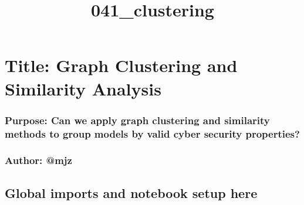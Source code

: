 \documentclass[11pt]{article}
\title{041\_clustering}
\begin{document}
    
    \maketitle
    
    

    
    \section{Title: Graph Clustering and Similarity
Analysis}\label{title-graph-clustering-and-similarity-analysis}

\subsubsection{Purpose: Can we apply graph clustering and similarity
methods to group models by valid cyber security
properties?}\label{purpose-can-we-apply-graph-clustering-and-similarity-methods-to-group-models-by-valid-cyber-security-properties}

\subsubsection{Author: @mjz}\label{author-mjz}

    \subsection{Global imports and notebook setup
here}\label{global-imports-and-notebook-setup-here}
\end{document}
